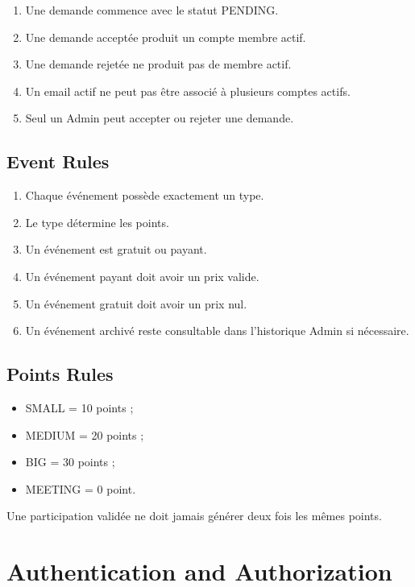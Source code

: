 \documentclass[11pt,a4paper]{report}
\begin{document}
\begin{enumerate}
    \item Une demande commence avec le statut PENDING.
    \item Une demande acceptée produit un compte membre actif.
    \item Une demande rejetée ne produit pas de membre actif.
    \item Un email actif ne peut pas être associé à plusieurs comptes actifs.
    \item Seul un Admin peut accepter ou rejeter une demande.
\end{enumerate}

\section{Event Rules}

\begin{enumerate}
    \item Chaque événement possède exactement un type.
    \item Le type détermine les points.
    \item Un événement est gratuit ou payant.
    \item Un événement payant doit avoir un prix valide.
    \item Un événement gratuit doit avoir un prix nul.
    \item Un événement archivé reste consultable dans l'historique Admin si nécessaire.
\end{enumerate}

\section{Points Rules}

\begin{itemize}
    \item SMALL = 10 points ;
    \item MEDIUM = 20 points ;
    \item BIG = 30 points ;
    \item MEETING = 0 point.
\end{itemize}

Une participation validée ne doit jamais générer deux fois les mêmes points.

\chapter{Authentication and Authorization}
\end{document}
